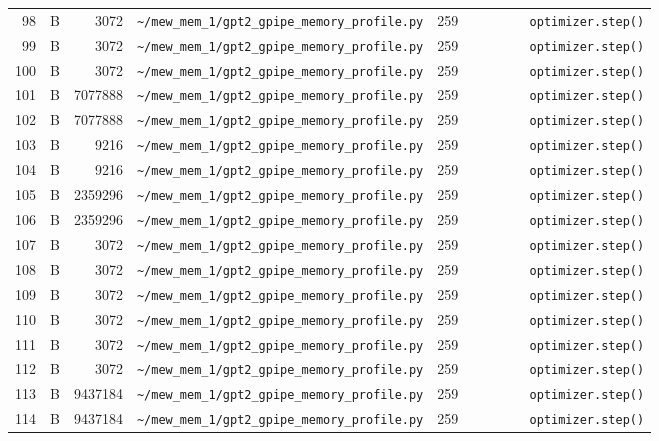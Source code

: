 \documentclass{article}
\begin{document}
\begin{longtable}{r l r p{6.5cm} r p{7.0cm}}
98 & B & 3072 & \lstinline|~/mew_mem_1/gpt2_gpipe_memory_profile.py| & 259 & \lstinline|        optimizer.step()| \\
99 & B & 3072 & \lstinline|~/mew_mem_1/gpt2_gpipe_memory_profile.py| & 259 & \lstinline|        optimizer.step()| \\
100 & B & 3072 & \lstinline|~/mew_mem_1/gpt2_gpipe_memory_profile.py| & 259 & \lstinline|        optimizer.step()| \\
101 & B & 7077888 & \lstinline|~/mew_mem_1/gpt2_gpipe_memory_profile.py| & 259 & \lstinline|        optimizer.step()| \\
102 & B & 7077888 & \lstinline|~/mew_mem_1/gpt2_gpipe_memory_profile.py| & 259 & \lstinline|        optimizer.step()| \\
103 & B & 9216 & \lstinline|~/mew_mem_1/gpt2_gpipe_memory_profile.py| & 259 & \lstinline|        optimizer.step()| \\
104 & B & 9216 & \lstinline|~/mew_mem_1/gpt2_gpipe_memory_profile.py| & 259 & \lstinline|        optimizer.step()| \\
105 & B & 2359296 & \lstinline|~/mew_mem_1/gpt2_gpipe_memory_profile.py| & 259 & \lstinline|        optimizer.step()| \\
106 & B & 2359296 & \lstinline|~/mew_mem_1/gpt2_gpipe_memory_profile.py| & 259 & \lstinline|        optimizer.step()| \\
107 & B & 3072 & \lstinline|~/mew_mem_1/gpt2_gpipe_memory_profile.py| & 259 & \lstinline|        optimizer.step()| \\
108 & B & 3072 & \lstinline|~/mew_mem_1/gpt2_gpipe_memory_profile.py| & 259 & \lstinline|        optimizer.step()| \\
109 & B & 3072 & \lstinline|~/mew_mem_1/gpt2_gpipe_memory_profile.py| & 259 & \lstinline|        optimizer.step()| \\
110 & B & 3072 & \lstinline|~/mew_mem_1/gpt2_gpipe_memory_profile.py| & 259 & \lstinline|        optimizer.step()| \\
111 & B & 3072 & \lstinline|~/mew_mem_1/gpt2_gpipe_memory_profile.py| & 259 & \lstinline|        optimizer.step()| \\
112 & B & 3072 & \lstinline|~/mew_mem_1/gpt2_gpipe_memory_profile.py| & 259 & \lstinline|        optimizer.step()| \\
113 & B & 9437184 & \lstinline|~/mew_mem_1/gpt2_gpipe_memory_profile.py| & 259 & \lstinline|        optimizer.step()| \\
114 & B & 9437184 & \lstinline|~/mew_mem_1/gpt2_gpipe_memory_profile.py| & 259 & \lstinline|        optimizer.step()| \\

\end{longtable}
\end{document}
